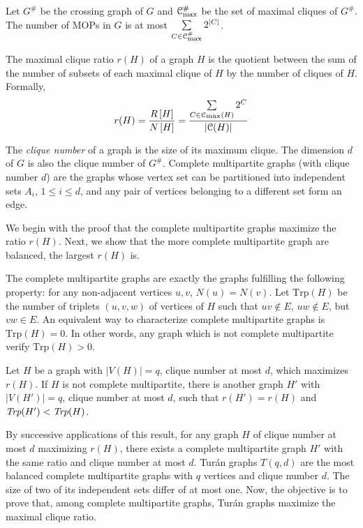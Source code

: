 \documentclass[a4paper,UKenglish,numberwithinsect,cleveref, autoref,anonymous]{lipics-v2021}
\newcommand{\card}[1]{\left| #1 \right|}
\newcommand{\mcalc}{\mathcal{C}}
\newcommand{\mcalcm}{\mathcal{C}_{\mbox{\scriptsize{max}}}}
\newcommand{\trp}{\mbox{Trp}}
\begin{document}
\begin{corollary}[\ref{co:mop_crossing}]
Let $G^{\#}$ be the crossing graph of $G$ and $\mcalcm^{\#}$ be the set of maximal cliques of $G^{\#}$. The number of MOPs in $G$ is at most $\sum\limits_{C \in \mcalcm^{\#}} 2^{\card{C}}$.
\label{co:mop_crossing_teaser}
\end{corollary}

\begin{definition}
The maximal clique ratio $r(H)$ of a graph $H$ is the quotient between the sum of the number of subsets of each maximal clique of $H$ by the number of cliques of $H$. Formally,
\[
r(H) = \frac{R\left[ H\right]}{N\left[ H\right]} = \frac{\sum\limits_{C \in \mcalcm(H)} 2^{C}}{\card{\mcalc(H)}}
\]
\end{definition}

The \textit{clique number} of a graph is the size of its maximum clique. The dimension $d$ of $G$ is also the clique number of $G^{\#}$. Complete multipartite graphs (with clique number $d$) are the graphs whose vertex set can be partitioned into independent sets $A_i$, $1\le i\le d$, and any pair of vertices belonging to a different set form an edge.

We begin with the proof that the complete multipartite graphs maximize the ratio $r(H)$. Next, we show that the more complete multipartite graph are balanced, the largest $r(H)$ is.

The complete multipartite graphs are exactly the graphs fulfilling the following property: for any non-adjacent vertices $u,v$, $N(u)=N(v)$. Let $\trp(H)$ be the number of triplets $(u,v,w)$ of vertices of $H$ such that $uv\notin E$, $uw \notin E$, but $vw \in E$. An equivalent way to characterize complete multipartite graphs is $\trp(H) = 0$. In other words, any graph which is not complete multipartite verify $\trp(H) > 0$. 

\begin{theorem}[\ref{th:complete_multi}]
Let $H$ be a graph with $\card{V(H)} = q$, clique number at most $d$, which maximizes $r(H)$. If $H$ is not complete multipartite, there is another graph $H'$ with $\card{V(H')} = q$, clique number at most $d$, such that $r(H') = r(H)$ and $\emph{Trp}(H') < \emph{Trp}(H)$. 
\label{th:complete_multi_teaser}
\end{theorem}

By successive applications of this result, for any graph $H$ of clique number at most $d$ maximizing $r(H)$, there exists a complete multipartite graph $H'$ with the same ratio and clique number at most $d$. 
Tur\'an graphs $T(q,d)$ are the most balanced complete multipartite graphs with $q$ vertices and clique number $d$. The size of two of its independent sets differ of at most one. Now, the objective is to prove that, among complete multipartite graphs, Tur\'an graphs maximize the maximal clique ratio.
\end{document}

